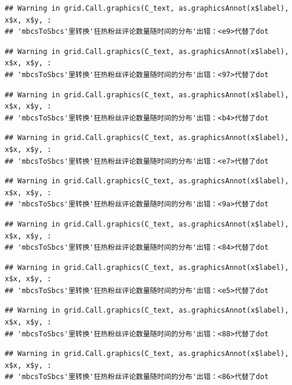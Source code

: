 \documentclass[
]{article}
\begin{document}
\begin{verbatim}
## Warning in grid.Call.graphics(C_text, as.graphicsAnnot(x$label), x$x, x$y, :
## 'mbcsToSbcs'里转换'狂热粉丝评论数量随时间的分布'出错：<e9>代替了dot
\end{verbatim}

\begin{verbatim}
## Warning in grid.Call.graphics(C_text, as.graphicsAnnot(x$label), x$x, x$y, :
## 'mbcsToSbcs'里转换'狂热粉丝评论数量随时间的分布'出错：<97>代替了dot
\end{verbatim}

\begin{verbatim}
## Warning in grid.Call.graphics(C_text, as.graphicsAnnot(x$label), x$x, x$y, :
## 'mbcsToSbcs'里转换'狂热粉丝评论数量随时间的分布'出错：<b4>代替了dot
\end{verbatim}

\begin{verbatim}
## Warning in grid.Call.graphics(C_text, as.graphicsAnnot(x$label), x$x, x$y, :
## 'mbcsToSbcs'里转换'狂热粉丝评论数量随时间的分布'出错：<e7>代替了dot
\end{verbatim}

\begin{verbatim}
## Warning in grid.Call.graphics(C_text, as.graphicsAnnot(x$label), x$x, x$y, :
## 'mbcsToSbcs'里转换'狂热粉丝评论数量随时间的分布'出错：<9a>代替了dot
\end{verbatim}

\begin{verbatim}
## Warning in grid.Call.graphics(C_text, as.graphicsAnnot(x$label), x$x, x$y, :
## 'mbcsToSbcs'里转换'狂热粉丝评论数量随时间的分布'出错：<84>代替了dot
\end{verbatim}

\begin{verbatim}
## Warning in grid.Call.graphics(C_text, as.graphicsAnnot(x$label), x$x, x$y, :
## 'mbcsToSbcs'里转换'狂热粉丝评论数量随时间的分布'出错：<e5>代替了dot
\end{verbatim}

\begin{verbatim}
## Warning in grid.Call.graphics(C_text, as.graphicsAnnot(x$label), x$x, x$y, :
## 'mbcsToSbcs'里转换'狂热粉丝评论数量随时间的分布'出错：<88>代替了dot
\end{verbatim}

\begin{verbatim}
## Warning in grid.Call.graphics(C_text, as.graphicsAnnot(x$label), x$x, x$y, :
## 'mbcsToSbcs'里转换'狂热粉丝评论数量随时间的分布'出错：<86>代替了dot
\end{verbatim}
\end{document}
